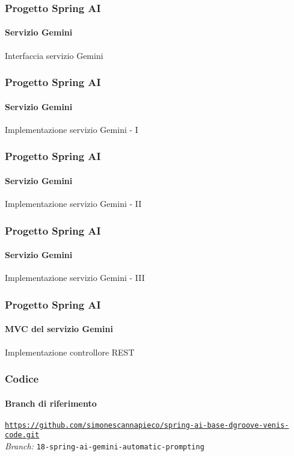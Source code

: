 %
\begin{frame}[t,fragile] \frametitle{Progetto Spring AI}
    \framesubtitle{Servizio Gemini}
        \vspace*{-.7cm}
        \begin{block}{Interfaccia servizio Gemini}
{\tiny}
    \end{block}
\end{frame}
%
\begin{frame}[t,fragile] \frametitle{Progetto Spring AI}
    \framesubtitle{Servizio Gemini}
		\vspace*{-.7cm}
        \begin{block}{Implementazione servizio Gemini - I}
            {\tiny}
    \end{block}
\end{frame}
%
\begin{frame}[t,fragile] \frametitle{Progetto Spring AI}
    \framesubtitle{Servizio Gemini}
        \vspace*{-.7cm}
        \begin{block}{Implementazione servizio Gemini - II}
            {\tiny}
    \end{block}
\end{frame}
%
\begin{frame}[t,fragile] \frametitle{Progetto Spring AI}
    \framesubtitle{Servizio Gemini}
        \vspace*{-.7cm}
        \begin{block}{Implementazione servizio Gemini - III}
            {\tiny}
    \end{block}
\end{frame}
%
\begin{frame}[t,fragile] \frametitle{Progetto Spring AI}
    \framesubtitle{MVC del servizio Gemini}
    	\vspace*{-.7cm}
        \begin{block}{Implementazione controllore REST}
			{\tiny}
    	\end{block}
\end{frame}
%
\begin{frame}[fragile] \frametitle{Codice}
    \framesubtitle{Branch di riferimento}
	\begin{center}
		{\scriptsize \href{https://github.com/simonescannapieco/spring-ai-base-dgroove-venis-code.git}{\texttt{https://github.com/simonescannapieco/spring-ai-base-dgroove-venis-code.git}}}\\
		\textit{Branch:} \alert{\texttt{18-spring-ai-gemini-automatic-prompting}}
	\end{center}
\end{frame}